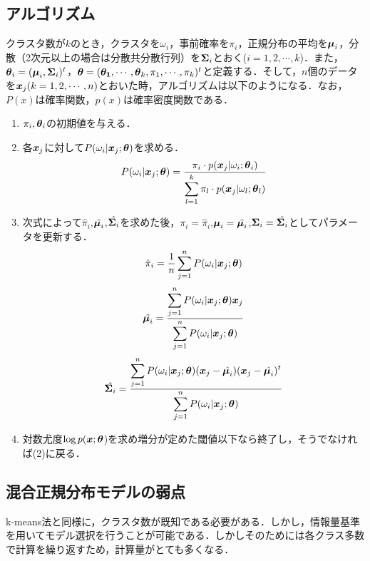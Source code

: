 \documentclass[a4j]{jsarticle}
\def\vec#1{\mbox{\boldmath $#1$}}
\begin{document}
\subsection{アルゴリズム}
\label{sec:gmm_algo}
クラスタ数が$k$のとき，クラスタを$\omega_i$，事前確率を$\pi_i$，正規分布の平均を$\vec{\mu}_i$，分散（2次元以上の場合は分散共分散行列）を$\vec{\Sigma}_i$とおく($i=1,2,\cdots,k$)．また，$\vec{\theta}_i = (\vec{\mu}_i,\vec{\Sigma}_i)^t$，$\vec{\theta} = (\vec{\theta_1},\cdots,\vec{\theta}_k,\pi_1,\cdots,\pi_k)^t$と定義する．そして，$n$個のデータを$\vec{x}_j(k=1,2,\cdots,n)$とおいた時，アルゴリズムは以下のようになる．なお，$P(x)$は確率関数，$p(x)$は確率密度関数である．
\begin{enumerate}
\item $\pi_i,\vec{\theta}_i$の初期値を与える．
\item 各$\vec{x}_j$に対して$P(\omega_i|\vec{x}_j;\vec{\theta})$を求める．
\begin{equation}
	\label{eq:gmm_cls}
P(\omega_i|\vec{x}_j;\vec\theta)
=\frac{\pi_i\cdot p(\vec {x}_j|\omega_i;\vec{\theta}_i)}{\displaystyle\sum_{l=1}^{k} \pi_l\cdot p(\vec{x}_j|\omega_l;\vec\theta_l)}
\end{equation}
\item 次式によって$\hat\pi_i$,$\hat{\vec{\mu}_i}$,$\hat{\vec{\Sigma}_i}$を求めた後，$\pi_i = \hat\pi_i$,$\vec{\mu}_i = \hat{\vec{\mu}_i}$,$\vec{\Sigma}_i = \hat{\vec{\Sigma}_i}$としてパラメータを更新する．
\begin{equation}
\label{eq:gmm_pi}
\hat\pi_i = \frac{1}{n}\displaystyle\sum_{j=1}^{n} P(\omega_i|\vec {x}_j;\vec\theta)
\end{equation}
\begin{equation}
	\label{eq:gmm_mu}
\hat{\vec{\mu}_i}= \frac{\displaystyle\sum_{j=1}^{n} P(\omega_i|\vec{x}_j;\vec\theta)\vec{x}_j}{\displaystyle\sum_{j=1}^{n} P(\omega_i|\vec{x}_j;\vec\theta)}
\end{equation}
\begin{equation}
	\label{eq:gmm_sigma}
\hat{\vec{\Sigma}_i}= \frac{\displaystyle\sum_{j=1}^{n} P(\omega_i|\vec{x}_j;\vec\theta)(\vec{x}_j - \hat{\vec{\mu}_i})(\vec{x}_j - \hat{\vec{\mu}_i})^t}
{\displaystyle\sum_{j=1}^{n} P(\omega_i|\vec{x}_j;\vec\theta)}
\end{equation}
\item 対数尤度$\log p(\vec x;\vec\theta$)を求め増分が定めた閾値以下なら終了し，そうでなければ(2)に戻る．
\end{enumerate}

\subsection{混合正規分布モデルの弱点}
k-means法と同様に，クラスタ数が既知である必要がある．しかし，情報量基準を用いてモデル選択を行うことが可能である．しかしそのためには各クラス多数で計算を繰り返すため，計算量がとても多くなる．



\end{document}
